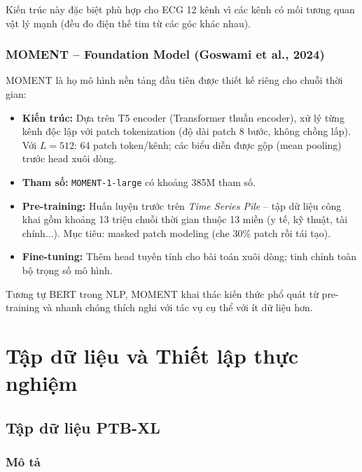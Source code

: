 \documentclass[12pt,a4paper]{report}
\begin{document}
Kiến trúc này đặc biệt phù hợp cho ECG 12 kênh vì các kênh có mối tương quan vật lý mạnh (đều đo điện thế tim từ các góc khác nhau).

\subsection{MOMENT -- Foundation Model (Goswami et al., 2024)}

MOMENT \cite{goswami2024} là họ mô hình nền tảng đầu tiên được thiết kế riêng cho chuỗi thời gian:

\begin{itemize}
  \item \textbf{Kiến trúc:} Dựa trên T5 encoder (Transformer thuần encoder), xử lý từng kênh độc lập với patch tokenization (độ dài patch 8 bước, không chồng lấp). Với $L = 512$: 64 patch token/kênh; các biểu diễn được gộp (mean pooling) trước head xuôi dòng.
  \item \textbf{Tham số:} \texttt{MOMENT-1-large} có khoảng 385M tham số.
  \item \textbf{Pre-training:} Huấn luyện trước trên \textit{Time Series Pile} -- tập dữ liệu công khai gồm khoảng 13 triệu chuỗi thời gian thuộc 13 miền (y tế, kỹ thuật, tài chính...). Mục tiêu: masked patch modeling (che 30\% patch rồi tái tạo).
  \item \textbf{Fine-tuning:} Thêm head tuyến tính cho bài toán xuôi dòng; tinh chỉnh toàn bộ trọng số mô hình.
\end{itemize}

Tương tự BERT trong NLP, MOMENT khai thác kiến thức phổ quát từ pre-training và nhanh chóng thích nghi với tác vụ cụ thể với ít dữ liệu hơn.

\chapter{Tập dữ liệu và Thiết lập thực nghiệm}
\label{chap:dataset}

\section{Tập dữ liệu PTB-XL}

\subsection{Mô tả}
\end{document}
